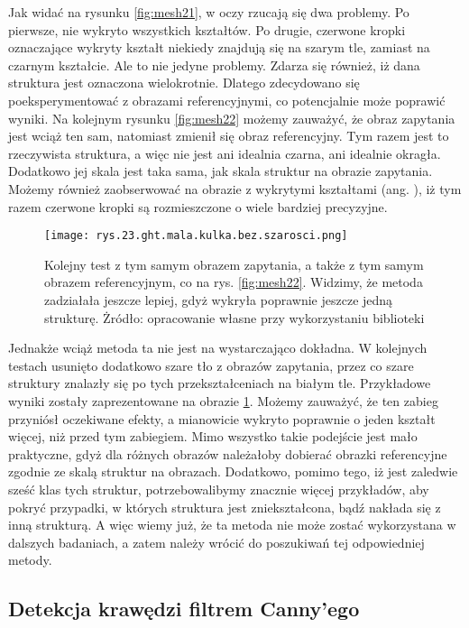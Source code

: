 Jak widać na rysunku \ref{fig:mesh21}, w oczy rzucają się dwa problemy. Po pierwsze, nie wykryto wszystkich kształtów. Po drugie, czerwone kropki oznaczające wykryty kształt niekiedy znajdują się na szarym tle, zamiast na czarnym kształcie. Ale to nie jedyne problemy. Zdarza się również, iż dana struktura jest oznaczona wielokrotnie. Dlatego zdecydowano się poeksperymentować z obrazami referencyjnymi, co potencjalnie może poprawić wyniki. Na kolejnym rysunku \ref{fig:mesh22} możemy zauważyć, że obraz zapytania jest wciąż ten sam, natomiast zmienił się obraz referencyjny. Tym razem jest to rzeczywista struktura, a więc nie jest ani idealnia czarna, ani idealnie okragła. Dodatkowo jej skala jest taka sama, jak skala struktur na obrazie zapytania. Możemy również zaobserwować na obrazie z wykrytymi kształtami (ang. ), iż tym razem czerwone kropki są rozmieszczone o wiele bardziej precyzyjne. 
\begin{figure}[h]
    \centering
    \texttt{[image: rys.23.ght.mala.kulka.bez.szarosci.png]}
    \caption{Kolejny test z tym samym obrazem zapytania, a także z tym samym obrazem referencyjnym, co na rys. \ref{fig:mesh22}. Widzimy, że metoda zadziałała jeszcze lepiej, gdyż wykryła poprawnie jeszcze jedną strukturę. Żródło: opracowanie własne przy wykorzystaniu biblioteki }
    \label{fig:mesh23}
\end{figure}
Jednakże wciąż metoda ta nie jest na wystarczająco dokładna. W kolejnych testach usunięto dodatkowo szare tło z obrazów zapytania, przez co szare struktury znalazły się po tych przekształceniach na białym tle. Przykładowe wyniki zostały zaprezentowane na obrazie \ref{fig:mesh23}. Możemy zauważyć, że ten zabieg przyniósł oczekiwane efekty, a mianowicie wykryto poprawnie o jeden kształt więcej, niż przed tym zabiegiem.
Mimo wszystko takie podejście jest mało praktyczne, gdyż dla różnych obrazów należałoby dobierać obrazki referencyjne zgodnie ze skalą struktur na obrazach. Dodatkowo, pomimo tego, iż jest zaledwie sześć klas tych struktur, potrzebowalibymy znacznie więcej przykładów, aby pokryć przypadki, w których struktura jest zniekształcona, bądź nakłada się z inną strukturą. A więc wiemy już, że ta metoda nie może zostać wykorzystana w dalszych badaniach, a zatem należy wrócić do poszukiwań tej odpowiedniej metody.

\subsection{Detekcja krawędzi filtrem Canny'ego}
\label{canny}

